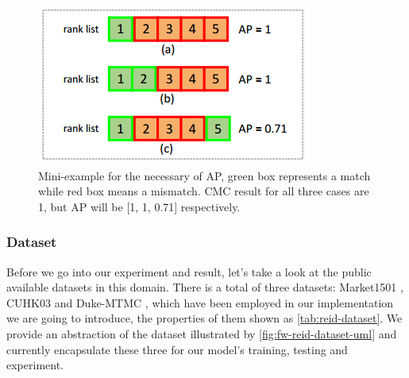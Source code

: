 \begin{figure}
    \begin{center}
        \includegraphics[scale=0.7]{figures/eval_cmc_vs_map.png}
    \end{center}
    \caption[Mini-example for the necessary of AP]
    {Mini-example for the necessary of AP, green box represents a match
        while red box means a mismatch. CMC result for all three cases are
        1, but AP will be [1, 1, 0.71] respectively.}
    \label{fig:map-mini-exmaple}
\end{figure}

\subsubsection{Dataset}
\label{sec:eval-recognizer-dataset}

Before we go into our experiment and result, let's take a look at the public
available datasets in this domain. There is a total of three datasets: Market1501
\cite{dataset-market1501-2015}, CUHK03 \cite{dataset-cuhk03-2014} and Duke-MTMC
\cite{dataset-dukemtmc-2016}, which have been employed in our implementation we
are going to introduce, the properties of them shown as
\autoref{tab:reid-dataset}. We provide an abstraction of the dataset
illustrated by \autoref{fig:fw-reid-dataset-uml} and currently encapsulate
these three for our model's training, testing and experiment.

